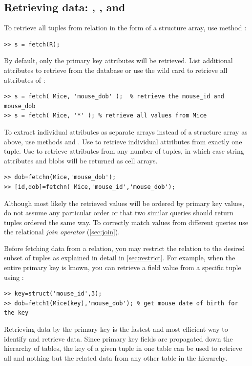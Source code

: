 \documentclass[10pt]{article}
\begin{document}
\subsection{Retrieving data:  , , and }\label{sec:fetch}

To retrieve all tuples from relation  in the form of a structure array, use method :
\begin{lstlisting}
>> s = fetch(R);
\end{lstlisting}

By default, only the primary key attributes will be retrieved.  List additional attributes to retrieve from the database or use the wild card   to retrieve all attributes of :
\begin{lstlisting}
>> s = fetch( Mice, 'mouse_dob' );  % retrieve the mouse_id and mouse_dob
>> s = fetch( Mice, '*' ); % retrieve all values from Mice
\end{lstlisting}

To extract individual attributes as separate arrays instead of a structure array as above, use methods  and .  Use  to retrieve individual attributes from exactly one tuple.  Use  to retrieve attributes from any number of tuples, in which case string attributes and blobs will be returned as cell arrays.
\begin{lstlisting}
>> dob=fetchn(Mice,'mouse_dob');
>> [id,dob]=fetchn( Mice,'mouse_id','mouse_dob');
\end{lstlisting}

Although most likely the retrieved values will be ordered by primary key values, do not assume any particular order or that two similar queries should return tuples ordered the same way.  To correctly match values from different queries use the relational \emph{join operator} (\autoref{sec:join}).

Before fetching data from a relation, you may restrict the relation to the desired subset of tuples as explained in detail in \autoref{sec:restrict}. For example, when the entire primary key is known, you can retrieve a field value from a specific tuple using :
\begin{lstlisting}
>> key=struct('mouse_id',3);
>> dob=fetch1(Mice(key),'mouse_dob'); % get mouse date of birth for the key 
\end{lstlisting}

Retrieving data by the primary key is the fastest and most efficient way to identify and retrieve data.  Since primary key fields are propagated down the hierarchy of tables, the key of a given tuple in one table can be used to retrieve all and nothing but the related data from any other table in the hierarchy.
\end{document}
